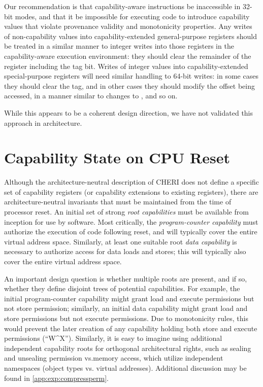 Our recommendation is that capability-aware instructions be inaccessible in
32-bit modes, and that it be impossible for executing code to introduce
capability values that violate provenance validity and monotonicity
properties.
Any writes of non-capability values into capability-extended general-purpose
registers should be treated in a similar manner to integer writes into those
registers in the capability-aware execution environment: they should clear the
remainder of the register including the tag bit.
Writes of integer values into capability-extended special-purpose registers
will need similar handling to 64-bit writes: in some cases they should clear
the tag, and in other cases they should modify the offset being accessed, in
a manner similar to changes to \PC{}, and so on.

While this appears to be a coherent design direction, we have not validated
this approach in architecture.

\section{Capability State on CPU Reset}
\label{sec:capability-state-on-cpu-reset}

Although the architecture-neutral description of CHERI does not define a
specific set of capability registers (or capability extensions to existing
registers), there are architecture-neutral invariants that must be maintained
from the time of processor reset.
An initial set of strong \textit{root capabilities} must be available from
inception for use by software.
Most critically, the \textit{program-counter capability} must authorize the
execution of code following reset, and will typically cover the entire virtual
address space.
Similarly, at least one suitable root \textit{data capability} is necessary to
authorize access for data loads and stores; this will typically also cover the
entire virtual address space.

An important design question is whether multiple roots are present, and if so,
whether they define disjoint trees of potential capabilities.
For example, the initial program-counter capability might grant load and
execute permissions but not store permission; similarly, an initial data
capability might grant load and store permissions but not execute permissions.
Due to monotonicity rules, this would prevent the later creation of any
capability holding both store and execute permissions (``W\^{}X'').
Similarly, it is easy to imagine using additional independent capability roots
for orthogonal architectural rights, such as sealing and unsealing permission
vs.\@ memory access, which utilize independent namespaces (object types vs.\@
virtual addresses).  Additional discussion may be found in
\cref{app:exp:compressperm}.

